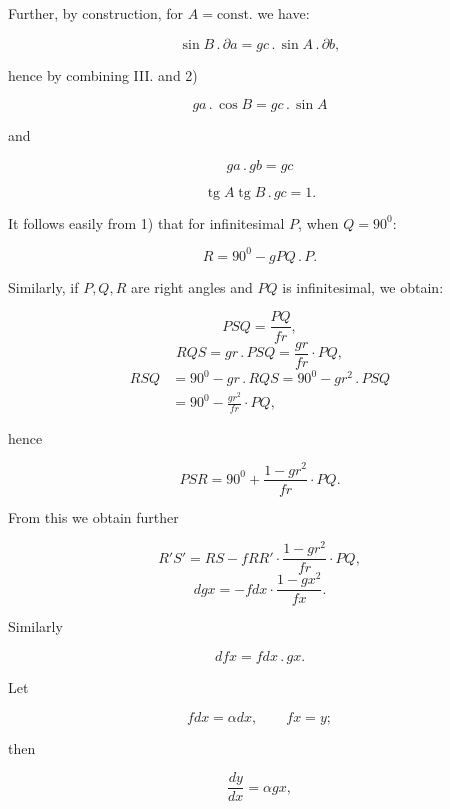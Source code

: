 %
\begin{center}\end{center}

\noindent Further, by construction, for $A = \text{const.}$ we have:

\[
\sin B\,.\,\partial a = gc\,.\,\sin A\,.\,\partial b,
\]

\noindent hence by combining III. and 2)

\[
ga\,.\,\cos B = gc\,.\,\sin A
\]

\noindent and

\[
\tag*{3)} ga\,.\,gb = gc
\]

\[
\tag*{4)} \operatorname{tg}A\operatorname{tg}B\,.\,gc = 1.
\]

\begin{center}\end{center}

\noindent It follows easily from 1) that for infinitesimal $P$, when $Q=90^{0}$:

\[
R = 90^{0} - gPQ\,.\,P.
\]

\begin{center}\end{center}

\noindent Similarly, if $P,Q,R$ are right angles and $PQ$ is infinitesimal, we obtain:

\[
PSQ = \frac{PQ}{fr},
\]
\[
RQS = gr\,.\,PSQ = \frac{gr}{fr}\cdot PQ,
\]
\[
\begin{aligned}RSQ &= 90^{0} - gr\,.\,RQS = 90^{0} - gr^{2}\,.\,PSQ\\ &= 90^{0} - \frac{gr^{2}}{fr}\cdot PQ,\end{aligned}
\]

\noindent hence

\[
PSR = 90^{0} + \frac{1-gr^{2}}{fr}\cdot PQ.
\]

\begin{center}\end{center}

\noindent From this we obtain further

\[
R'S' = RS - fRR'\cdot\frac{1-gr^{2}}{fr}\cdot PQ,
\]
\[
dgx = -fdx\cdot\frac{1-gx^{2}}{fx}.
\]

\noindent Similarly

\begin{center}\end{center}

\[
dfx = fdx\,.\,gx.
\]

\noindent Let

\[
fdx = \alpha dx, \qquad fx = y;
\]

\noindent then

\[
\frac{dy}{dx} = \alpha gx,
\]
